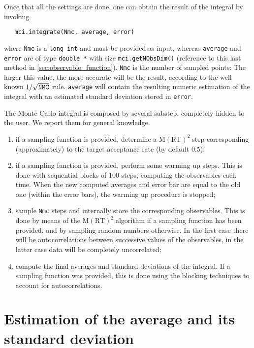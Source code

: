 \documentclass[11pt,a4paper,twoside]{article}
\newcommand{\MRTWO}{$ \text{M}(\text{RT})^2 \;$}
\begin{document}
Once that all the settings are done, one can obtain the result of the integral by invoking
\begin{verbatim}
   mci.integrate(Nmc, average, error)
\end{verbatim}
where \verb+Nmc+ is a \verb+long int+ and must be provided as input, whereas \verb+average+ and \verb+error+ are of type \verb+double *+ with size \verb+mci.getNObsDim()+ (reference to this last method in \ref{sec:observable_function}).
\verb+Nmc+ is the number of sampled points: The larger this value, the more accurate will be the result, according to the well known $1/\sqrt{\verb+NMC+}$ rule.
\verb+average+ will contain the resulting numeric estimation of the integral with an estimated standard deviation stored in \verb+error+.

The Monte Carlo integral is composed by several substep, completely hidden to the user.
We report them for general knowledge.
\begin{enumerate}
   \item if a sampling function is provided, determine a \MRTWO step corresponding (approximately) to the target acceptance rate (by default $0.5$);
   \item if a sampling function is provided, perform some warming up steps. This is done with sequential blocks of $100$ steps, computing the observables each time. When the new computed averages and error bar are equal to the old one (within the error bars), the warming up procedure is stopped;
   \item sample \verb+Nmc+ steps and internally store the corresponding observables. This is done by means of the \MRTWO algorithm if a sampling function has been provided, and by sampling random numbers otherwise. In the first case there will be autocorrelations between successive values of the observables, in the latter case data will be completely uncorrelated;
   \item compute the final averages and standard deviations of the integral. If a sampling function was provided, this is done using the blocking techniques to account for autocorrelations.
\end{enumerate}





\section{Estimation of the average and its standard deviation} %
\label{sec:mean_estimation_and_standard_deviation}
\end{document}
